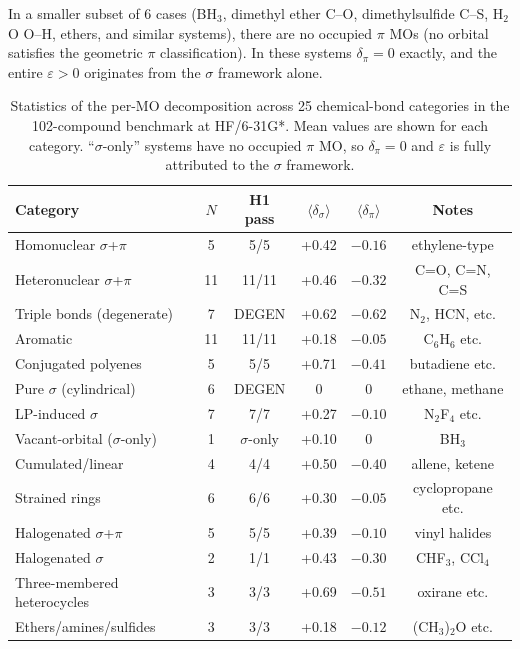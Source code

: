 \documentclass[twoside,natbib]{svjour3}
\newcommand{\delsg}{\delta_{\sigma}}
\newcommand{\delpi}{\delta_{\pi}}
\newcommand{\eps}{\varepsilon}
\begin{document}
In a smaller subset of 6 cases (BH$_3$, dimethyl ether C--O, dimethylsulfide
C--S, H$_2$O O--H, ethers, and similar systems), there are no
occupied $\pi$ MOs (no orbital satisfies the geometric $\pi$
classification). In these systems $\delpi = 0$ exactly, and the entire
$\eps > 0$ originates from the $\sigma$ framework alone.

\begin{table}[t]
\centering
\caption{Statistics of the per-MO decomposition across 25 chemical-bond
categories in the 102-compound benchmark at HF/6-31G*. Mean values are
shown for each category. ``$\sigma$-only'' systems have no occupied
$\pi$ MO, so $\delpi = 0$ and $\eps$ is fully attributed to the
$\sigma$ framework.}
\label{tab:categories}
\begin{tabular}{lccccc}
\toprule
Category & $N$ & H1 pass & $\langle \delsg \rangle$ & $\langle \delpi \rangle$ & Notes \\
\midrule
Homonuclear $\sigma$+$\pi$  & 5 & 5/5 & +0.42 & $-0.16$ & ethylene-type \\
Heteronuclear $\sigma$+$\pi$ & 11 & 11/11 & +0.46 & $-0.32$ & C=O, C=N, C=S \\
Triple bonds (degenerate)   & 7 & DEGEN & +0.62 & $-0.62$ & N$_2$, HCN, etc. \\
Aromatic                    & 11 & 11/11 & +0.18 & $-0.05$ & C$_6$H$_6$ etc. \\
Conjugated polyenes         & 5 & 5/5 & +0.71 & $-0.41$ & butadiene etc. \\
Pure $\sigma$ (cylindrical) & 6 & DEGEN & 0 & 0 & ethane, methane \\
LP-induced $\sigma$         & 7 & 7/7 & +0.27 & $-0.10$ & N$_2$F$_4$ etc. \\
Vacant-orbital ($\sigma$-only) & 1 & $\sigma$-only & +0.10 & 0 & BH$_3$ \\
Cumulated/linear            & 4 & 4/4 & +0.50 & $-0.40$ & allene, ketene \\
Strained rings              & 6 & 6/6 & +0.30 & $-0.05$ & cyclopropane etc. \\
Halogenated $\sigma$+$\pi$  & 5 & 5/5 & +0.39 & $-0.10$ & vinyl halides \\
Halogenated $\sigma$        & 2 & 1/1 & +0.43 & $-0.30$ & CHF$_3$, CCl$_4$ \\
Three-membered heterocycles & 3 & 3/3 & +0.69 & $-0.51$ & oxirane etc. \\
Ethers/amines/sulfides      & 3 & 3/3 & +0.18 & $-0.12$ & (CH$_3$)$_2$O etc. \\

\end{tabular}
\end{table}
\end{document}
